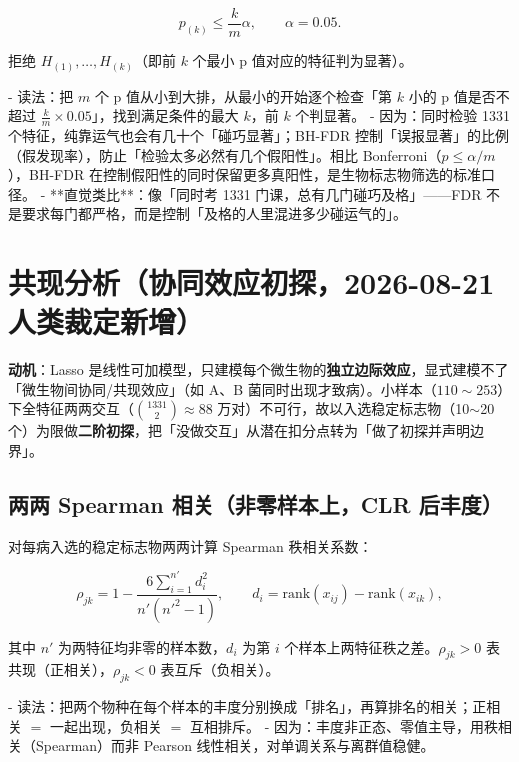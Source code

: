 \documentclass{internal-report}
\begin{document}
\begin{equation}
  p_{(k)} \le \frac{k}{m}\alpha,
  \qquad
  \alpha = 0.05.
  \label{eq:fdr}
\end{equation}

拒绝 $H_{(1)},\dots,H_{(k)}$（即前 $k$ 个最小 p 值对应的特征判为显著）。

- 读法：把 $m$ 个 p 值从小到大排，从最小的开始逐个检查「第 $k$ 小的 p 值是否不超过 $\frac{k}{m}\times 0.05$」，找到满足条件的最大 $k$，前 $k$ 个判显著。
- 因为：同时检验 1331 个特征，纯靠运气也会有几十个「碰巧显著」；BH-FDR 控制「误报显著」的比例（假发现率），防止「检验太多必然有几个假阳性」。相比 Bonferroni（$p\le\alpha/m$），BH-FDR 在控制假阳性的同时保留更多真阳性，是生物标志物筛选的标准口径。
- **直觉类比**：像「同时考 1331 门课，总有几门碰巧及格」——FDR 不是要求每门都严格，而是控制「及格的人里混进多少碰运气的」。

\section{共现分析（协同效应初探，2026-08-21 人类裁定新增）}
\label{sec:cooccur}

\textbf{动机}：Lasso 是线性可加模型，只建模每个微生物的\textbf{独立边际效应}，显式建模不了「微生物间协同/共现效应」（如 A、B 菌同时出现才致病）。小样本（$110\sim253$）下全特征两两交互（$\binom{1331}{2}\approx 88$ 万对）不可行，故以入选稳定标志物（10$\sim$20 个）为限做\textbf{二阶初探}，把「没做交互」从潜在扣分点转为「做了初探并声明边界」。

\subsection{两两 Spearman 相关（非零样本上，CLR 后丰度）}
\label{sec:spearman}

对每病入选的稳定标志物两两计算 Spearman 秩相关系数：

\begin{equation}
  \rho_{jk} = 1 - \frac{6\sum_{i=1}^{n'} d_i^2}{n'(n'^2-1)},
  \qquad
  d_i = \mathrm{rank}(x_{ij}) - \mathrm{rank}(x_{ik}),
  \label{eq:spearman}
\end{equation}

其中 $n'$ 为两特征均非零的样本数，$d_i$ 为第 $i$ 个样本上两特征秩之差。$\rho_{jk}>0$ 表共现（正相关），$\rho_{jk}<0$ 表互斥（负相关）。

- 读法：把两个物种在每个样本的丰度分别换成「排名」，再算排名的相关；正相关 $=$ 一起出现，负相关 $=$ 互相排斥。
- 因为：丰度非正态、零值主导，用秩相关（Spearman）而非 Pearson 线性相关，对单调关系与离群值稳健。
\end{document}
